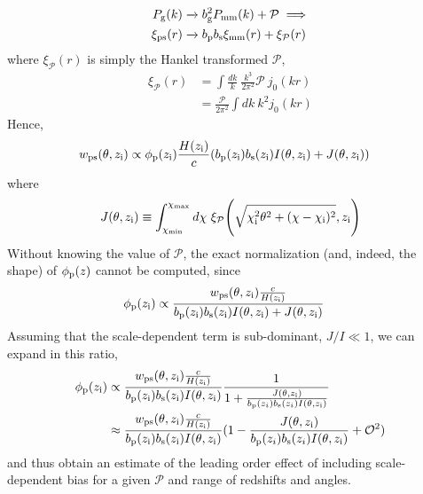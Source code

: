 \begin{align}
    P_{\rm g}(k) &\xrightarrow{} b_{\rm g}^2P_{\rm mm}(k) + \mathcal{P} \implies \\
    \xi_{\rm ps}(r) &\xrightarrow{} b_{\rm p}b_{\rm s}\xi_{\rm mm}(r) + \xi_{\mathcal{P}}(r)
\end{align}
where $\xi_{\mathcal{P}}(r)$ is simply the Hankel transformed $\mathcal{P}$,
\begin{align}
    \xi_{\mathcal{P}}(r) &= \int \frac{dk}{k} \ \frac{k^3}{2\pi^2} \mathcal{P} \ j_0(kr) \\
     &= \frac{\mathcal{P}}{2\pi^2}\int dk \ k^2 j_0(kr)
\end{align}
Hence, 
\begin{align}
    w_{\rm ps}(\theta, z_{\rm i}) &\propto \phi_{\rm p}(z_{\rm i})\frac{H(z_{\rm i})}{c}(b_{\rm p}(z_{\rm i})b_{\rm s}(z_{\rm i}){I}(\theta, z_{\rm i}) + J(\theta, z_{\rm i}))
\end{align}
where 
\begin{align}
    J(\theta, z_{\rm i}) \equiv \int_{\chi_{\rm min}}^{\chi_{\rm max}}d\chi \ \xi_{\mathcal{P}}{\Bigg (}\sqrt{\chi_{\rm i}^2\theta^2 + (\chi-\chi_{\rm i})^2},z_{\rm i}{\Bigg )}
\end{align}
Without knowing the value of $\mathcal{P}$, the exact normalization (and, indeed, the shape) of $\phi_{\rm p}(z)$ cannot be computed, since
\begin{align}
    \phi_{\rm p}(z_{\rm i}) &\propto \frac{{w}_{\rm ps}(\theta, z_{\rm i})\frac{c}{H(z_{\rm i})}}{b_{\rm p}(z_{\rm i})b_{\rm s}(z_{\rm i}){I}(\theta, z_{\rm i}) + {J}(\theta, z_{\rm i})}
\end{align}
Assuming that the scale-dependent term is sub-dominant, $J/I \ll 1$, we can expand in this ratio,
\begin{align}
    \phi_{\rm p}(z_{\rm i}) &\propto \frac{{w}_{\rm ps}(\theta, z_{\rm i})\frac{c}{H(z_{\rm i})}}{b_{\rm p}(z_{\rm i})b_{\rm s}(z_{\rm i}){I}(\theta, z_{\rm i})}\frac{1}{1 + \frac{J(\theta, z_{\rm i})}{b_{\rm p}(z_i)b_{\rm s}(z_i)I(\theta, z_{\rm i})}} \\
    &\approx \frac{{w}_{\rm ps}(\theta, z_{\rm i})\frac{c}{H(z_{\rm i})}}{b_{\rm p}(z_{\rm i})b_{\rm s}(z_{\rm i}){I}(\theta, z_{\rm i})}(1 - \frac{J(\theta, z_{\rm i})}{b_{\rm p}(z_i)b_{\rm s}(z_i)I(\theta, z_{\rm i})} + \mathcal{O}^2) \nonumber
\end{align}
and thus obtain an estimate of the leading order effect of including scale-dependent bias for a given $\mathcal{P}$ and range of redshifts and angles.